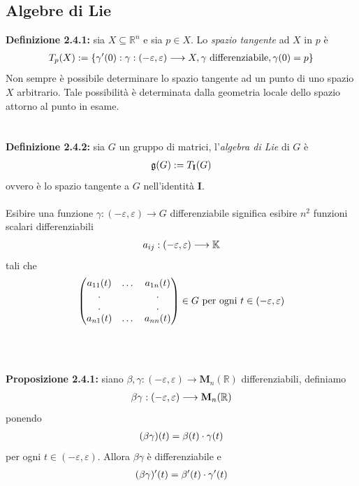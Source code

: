 \documentclass{article}
\begin{document}
\newpage
\subsection{Algebre di Lie}
\textbf{Definizione 2.4.1:} sia $X \subseteq \mathbb{R}^n$ e sia $p \in X$. Lo \textit{spazio tangente} ad $X$ in $p$ è
\begin{gather}
    T_p(X) := \{ \gamma'(0) : \gamma : (-\varepsilon, \varepsilon) \longrightarrow X, \gamma \text{ differenziabile}, \gamma(0) = p \} \notag
\end{gather}
Non sempre è possibile determinare lo spazio tangente ad un punto di uno spazio $X$ arbitrario. Tale possibilità è determinata dalla geometria locale dello spazio attorno al punto in esame. \\ \\ \\
\textbf{Definizione 2.4.2:} sia $G$ un gruppo di matrici, l'\textit{algebra di Lie} di $G$ è
\begin{gather}
    \mathfrak{g}(G) := T_{\mathbf{I}}(G) \notag
\end{gather}
ovvero è lo spazio tangente a $G$ nell'identità $\mathbf{I}$. \\ \\
Esibire una funzione $\gamma : (-\varepsilon, \varepsilon) \longrightarrow G$ differenziabile significa esibire $n^2$ funzioni scalari differenziabili
\begin{gather}
    a_{ij} : (-\varepsilon, \varepsilon) \longrightarrow \mathbb{K} \notag
\end{gather}
tali che
\begin{gather}
    \begin{pmatrix}
        a_{11}(t) & \dots & a_{1n}(t) \\
        . & & . \\
        . & & . \\
        a_{n1}(t) & \dots & a_{nn}(t) 
    \end{pmatrix} \in G \text{ per ogni } t \in (-\varepsilon, \varepsilon) \notag
\end{gather} \\ \\ \\
\textbf{Proposizione 2.4.1:} siano $\beta, \gamma : (-\varepsilon, \varepsilon) \longrightarrow \mathbf{M}_n(\mathbb{R})$ differenziabili, definiamo
\begin{gather}
    \beta\gamma : (-\varepsilon, \varepsilon) \longrightarrow \mathbf{M}_n(\mathbb{R}) \notag
\end{gather}
ponendo
\begin{gather}
    (\beta\gamma)(t) = \beta(t) \cdot \gamma(t) \notag
\end{gather}
per ogni $t \in (-\varepsilon, \varepsilon)$. Allora $\beta\gamma$ è differenziabile e
\begin{gather}
    (\beta\gamma)'(t) = \beta'(t) \cdot \gamma'(t) \notag
\end{gather} \\
\end{document}
